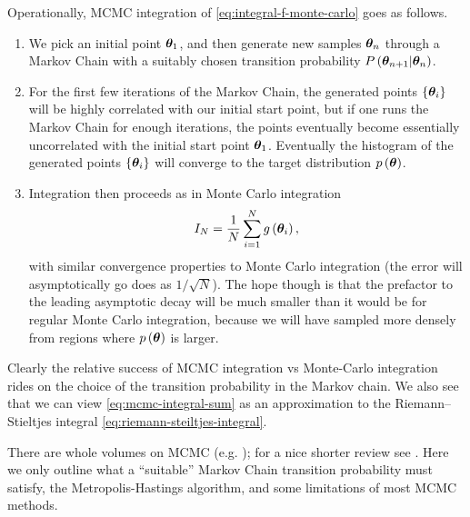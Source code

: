 Operationally, MCMC integration of \eqref{eq:integral-f-monte-carlo}
goes as follows.
\begin{enumerate}
    \item We pick an initial point ${\bm \theta}_1$, and then generate new samples ${\bm \theta}_n$ through a Markov Chain with a suitably chosen transition probability $P\left({\bm \theta}_{n+1}|{\bm \theta}_n\right)$.
    \item For the first few iterations of the Markov Chain, the generated points $\{{\bm \theta}_i\}$ will be highly correlated with our initial start point, but if one runs the Markov Chain for enough iterations, the points eventually become essentially uncorrelated with the initial start point ${\bm \theta}_1$.
        Eventually the histogram of the generated points $\{{\bm \theta}_i\}$ will converge to the target distribution $p\left({\bm \theta}\right)$.
    \item Integration then proceeds as in Monte Carlo integration
        \begin{align}
            \label{eq:mcmc-integral-sum}
            I_N
            =
            \frac{1}{N}\sum_{i=1}^N g\left({\bm \theta}_i\right)
            ,
        \end{align}
        with similar convergence properties to Monte Carlo integration (the error will asymptotically go does as $1/\sqrt{N}$).
        The hope though is that the prefactor to the leading asymptotic decay will be much smaller than it would be for regular Monte Carlo integration, because we will have sampled more densely from regions where $p\left({\bm \theta}\right)$ is larger.
\end{enumerate}
Clearly the relative success of MCMC integration vs Monte-Carlo integration rides on the choice of the transition probability in the Markov chain.
We also see that we can view \eqref{eq:mcmc-integral-sum} as an approximation to the Riemann–Stieltjes integral \eqref{eq:riemann-steiltjes-integral}.

There are whole volumes on MCMC (e.g. \cite{brooks2011handbook}); 
for a nice shorter review see \cite{Hogg:2017akh}.
Here we only outline what a ``suitable'' Markov Chain transition probability
must satisfy, the Metropolis-Hastings algorithm, and some limitations
of most MCMC methods.

